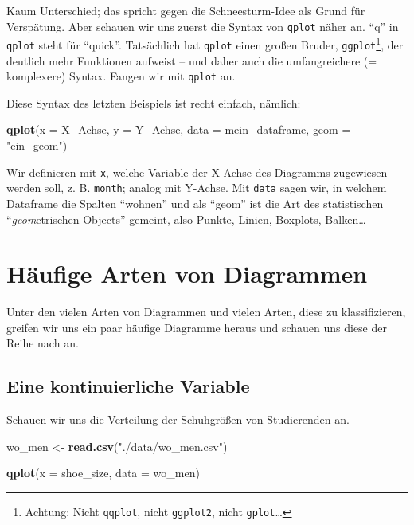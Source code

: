 \documentclass[12pt,ngerman,paper=a4,pagesize,DIV=13]{scrreprt}
\newenvironment{Shaded}{\begin{snugshade}}{\end{snugshade}}
\newcommand{\DataTypeTok}[1]{\textcolor[rgb]{0.13,0.29,0.53}{#1}}
\newcommand{\KeywordTok}[1]{\textcolor[rgb]{0.13,0.29,0.53}{\textbf{#1}}}
\newcommand{\NormalTok}[1]{#1}
\newcommand{\StringTok}[1]{\textcolor[rgb]{0.31,0.60,0.02}{#1}}
\begin{document}
Kaum Unterschied; das spricht gegen die Schneesturm-Idee als Grund für
Verspätung. Aber schauen wir uns zuerst die Syntax von \texttt{qplot}
näher an. \enquote{q} in \texttt{qplot} steht für \enquote{quick}.
Tatsächlich hat \texttt{qplot} einen großen Bruder,
\texttt{ggplot}\footnote{Achtung: Nicht \texttt{qqplot}, nicht
  \texttt{ggplot2}, nicht \texttt{gplot}\ldots{}}, der deutlich mehr
Funktionen aufweist -- und daher auch die umfangreichere (= komplexere)
Syntax. Fangen wir mit \texttt{qplot} an.

Diese Syntax des letzten Beispiels ist recht einfach, nämlich:

\begin{Shaded}
\begin{Highlighting}[]
\KeywordTok{qplot}\NormalTok{(}\DataTypeTok{x =}\NormalTok{ X_Achse, }\DataTypeTok{y =}\NormalTok{ Y_Achse, }\DataTypeTok{data =}\NormalTok{ mein_dataframe, }\DataTypeTok{geom =} \StringTok{"ein_geom"}\NormalTok{)}
\end{Highlighting}
\end{Shaded}

Wir definieren mit \texttt{x}, welche Variable der X-Achse des Diagramms
zugewiesen werden soll, z. B. \texttt{month}; analog mit Y-Achse. Mit
\texttt{data} sagen wir, in welchem Dataframe die Spalten
\enquote{wohnen} und als \enquote{geom} ist die Art des statistischen
\enquote{\emph{geom}etrischen Objects} gemeint, also Punkte, Linien,
Boxplots, Balken\ldots{}

\hypertarget{haufige-arten-von-diagrammen}{%
\section{Häufige Arten von
Diagrammen}\label{haufige-arten-von-diagrammen}}

Unter den vielen Arten von Diagrammen und vielen Arten, diese zu
klassifizieren, greifen wir uns ein paar häufige Diagramme heraus und
schauen uns diese der Reihe nach an.

\hypertarget{eine-kontinuierliche-variable}{%
\subsection{Eine kontinuierliche
Variable}\label{eine-kontinuierliche-variable}}

Schauen wir uns die Verteilung der Schuhgrößen von Studierenden an.

\begin{Shaded}
\begin{Highlighting}[]
\NormalTok{wo_men <-}\StringTok{ }\KeywordTok{read.csv}\NormalTok{(}\StringTok{"./data/wo_men.csv"}\NormalTok{)}

\KeywordTok{qplot}\NormalTok{(}\DataTypeTok{x =}\NormalTok{ shoe_size, }\DataTypeTok{data =}\NormalTok{ wo_men)}
\end{Highlighting}
\end{Shaded}
\end{document}
